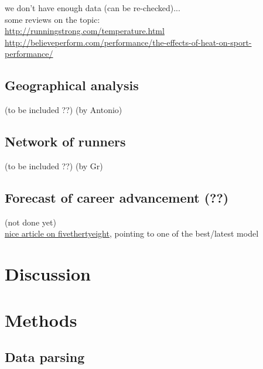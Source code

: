 \documentclass[fleqn,10pt]{wlscirep}
\begin{document}
			we don't have enough data (can be re-checked)...\\
			
			some reviews on the topic:\\
			\url{http://runningstrong.com/temperature.html}\\
			\url{http://believeperform.com/performance/the-effects-of-heat-on-sport-performance/}
			
	
	
		\subsection*{Geographical analysis}
	
			(to be included ??)
			(by Antonio)
		
	
		\subsection*{Network of runners}
	
				(to be included ??)
				(by Gr)
		
		\subsection*{Forecast of career advancement (??)}
	
				(not done yet)		\\
				\href{https://fivethirtyeight.com/features/tell-us-two-things-and-well-tell-you-how-fast-youd-run-a-marathon/}{nice article on fivethertyeight},
				pointing to one of the best/latest model \cite{vickers2016empirical}

	

\section*{Discussion}


\section*{Methods}


	\subsection*{Data parsing}
	
\end{document}
